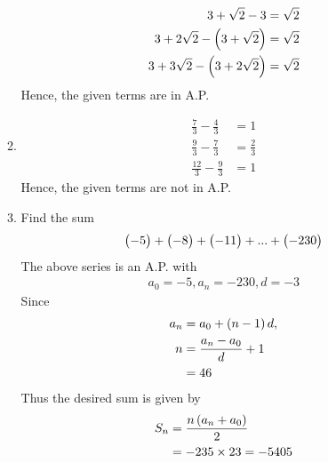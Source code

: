 \documentclass[journal,12pt,twocolumn]{IEEEtran}
\begin{document}
\begin{enumerate}
\begin{enumerate}
				\begin{align}
					3 + \sqrt{2} - 3 = \sqrt{2} \\
					3 + 2\sqrt{2} - \left(3+ \sqrt{2}\right)= \sqrt{2} \\
					3 + 3\sqrt{2} - \left(3+ 2\sqrt{2}\right)= \sqrt{2} 
				\end{align}
				Hence, the given terms are in A.P.
    \item 
	    \begin{align}
		    \frac{7}{3} -   \frac{4}{3} &= 1
		    \\
		     \frac{9}{3}-\frac{7}{3} &= \frac{2}{3}
		     \\
		    \frac{12}{3}-\frac{9}{3} &= 1
	    \end{align}
				Hence, the given terms are not in A.P.
    \item Find the sum
	    \begin{align}
    \begin{pmatrix}-5\end{pmatrix} + \begin{pmatrix}-8\end{pmatrix} + \begin{pmatrix}-11\end{pmatrix} + ... + \begin{pmatrix}-230\end{pmatrix}
	    \end{align}
	    \solution The above series is an A.P. with 
	    \begin{align}
		    a_0 = -5, a_n = -230, d = -3
	    \end{align}
	    Since 
	    \begin{align}
		    a_n &= a_0 + \left(n-1\right)d, 
		    \\
		    n &= \frac{a_n - a_0}{d} + 1
		    \\
		     &= 46
	    \end{align}
	    Thus the desired sum is given by 
	    \begin{align}
		    S_n &=  \frac{n\left(a_n + a_0\right)}{2}  
		    \\
		    &=  -235 \times 23 = -5405
	    \end{align}
    
\end{enumerate}

    
    
\end{enumerate}
\end{document}
